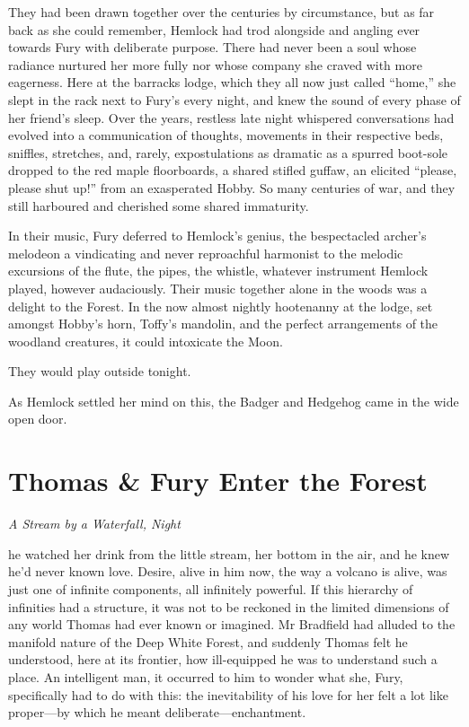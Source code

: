 \documentclass[11pt,a5paper]{article}
\newcommand{\alet}[1]{\textit{#1}\vspace{1em}}
\begin{document}
They had been drawn together over the centuries by circumstance, but as far back as she could remember, Hemlock had trod alongside and angling ever towards Fury with deliberate purpose. There had never been a soul whose radiance nurtured her more fully nor whose company she craved with more eagerness. Here at the barracks lodge, which they all now just called ``home,'' she slept in the rack next to Fury's every night, and knew the sound of every phase of her friend's sleep. Over the years, restless late night whispered conversations had evolved into a communication of thoughts, movements in their respective beds, sniffles, stretches, and, rarely, expostulations as dramatic as a spurred boot-sole dropped to the red maple floorboards, a shared stifled guffaw, an elicited ``please, please shut up!'' from an exasperated Hobby. So many centuries of war, and they still harboured and cherished some shared immaturity.

In their music, Fury deferred to Hemlock's genius, the bespectacled archer's melodeon a vindicating and never reproachful harmonist to the melodic excursions of the flute, the pipes, the whistle, whatever instrument Hemlock played, however audaciously. Their music together alone in the woods was a delight to the Forest. In the now almost nightly hootenanny at the lodge, set amongst Hobby's horn, Toffy's mandolin, and the perfect arrangements of the woodland creatures, it could intoxicate the Moon.

They would play outside tonight.

As Hemlock settled her mind on this, the Badger and Hedgehog came in the wide open door.

\newpage

\section{Thomas \& Fury Enter the Forest}

\alet{A Stream by a Waterfall, Night}

 he watched her drink from the little stream, her bottom in the air, and he knew he'd never known love. Desire, alive in him now, the way a volcano is alive, was just one of infinite components, all infinitely powerful. If this hierarchy of infinities had a structure, it was not to be reckoned in the limited dimensions of any world Thomas had ever known or imagined. Mr Bradfield had alluded to the manifold nature of the Deep White Forest, and suddenly Thomas felt he understood, here at its frontier, how ill-equipped he was to understand such a place. An intelligent man, it occurred to him to wonder what she, Fury, specifically had to do with this: the inevitability of his love for her felt a lot like proper---by which he meant deliberate---enchantment.
\end{document}
